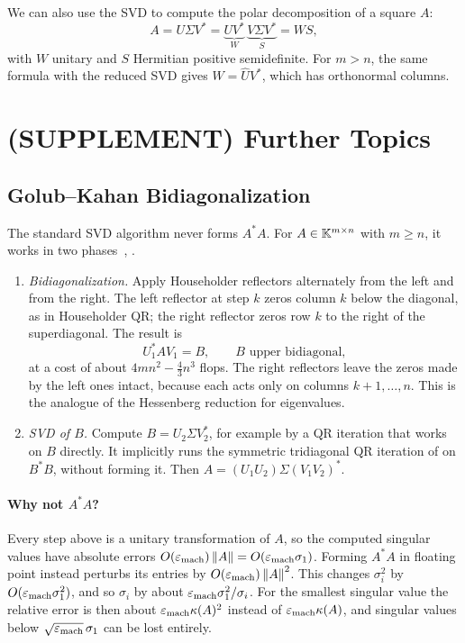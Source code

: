 We can also use the SVD to compute the polar decomposition of a square $A$:
\begin{equation}
  A = U\Sigma V^\ast = \underbrace{UV^\ast}_{W}\,\underbrace{V\Sigma V^\ast}_{S} = WS,
\end{equation}
with $W$ unitary and $S$ Hermitian positive semidefinite. For $m > n$, the same formula with the reduced SVD gives $W = \hat{U}V^\ast$, which has orthonormal columns.

\section{(SUPPLEMENT) Further Topics}
\label{sec:shifts-svd-supp}

\subsection{Golub--Kahan Bidiagonalization}

The standard SVD algorithm never forms $A^\ast A$. For $A \in \mathbb{K}^{m \times n}$ with $m \ge n$, it works in two phases~\cite[Lecture 31]{TB}, \cite[Section 5.4]{Demmel}.
\begin{enumerate}
  \item \emph{Bidiagonalization.} Apply Householder reflectors alternately from the left and from the right. The left reflector at step $k$ zeros column $k$ below the diagonal, as in Householder QR; the right reflector zeros row $k$ to the right of the superdiagonal. The result is
  \begin{equation}
    U_1^\ast AV_1 = B, \qquad B \text{ upper bidiagonal},
  \end{equation}
  at a cost of about $4mn^2 - \frac{4}{3}n^3$ flops. The right reflectors leave the zeros made by the left ones intact, because each acts only on columns $k + 1, \dots, n$. This is the analogue of the Hessenberg reduction for eigenvalues.
  \item \emph{SVD of $B$.} Compute $B = U_2\Sigma V_2^\ast$, for example by a QR iteration that works on $B$ directly. It implicitly runs the symmetric tridiagonal QR iteration of  on $B^\ast B$, without forming it. Then $A = (U_1U_2)\Sigma(V_1V_2)^\ast$.
\end{enumerate}

\paragraph{Why not $A^\ast A$?} Every step above is a unitary transformation of $A$, so the computed singular values have absolute errors $O(\varepsilon_{\mathrm{mach}})\left\lVert A \right\rVert = O(\varepsilon_{\mathrm{mach}}\sigma_1)$. Forming $A^\ast A$ in floating point instead perturbs its entries by $O(\varepsilon_{\mathrm{mach}})\left\lVert A \right\rVert^2$. This changes $\sigma_i^2$ by $O(\varepsilon_{\mathrm{mach}}\sigma_1^2)$, and so $\sigma_i$ by about $\varepsilon_{\mathrm{mach}}\sigma_1^2/\sigma_i$. For the smallest singular value the relative error is then about $\varepsilon_{\mathrm{mach}}\kappa(A)^2$ instead of $\varepsilon_{\mathrm{mach}}\kappa(A)$, and singular values below $\sqrt{\varepsilon_{\mathrm{mach}}}\,\sigma_1$ can be lost entirely.

